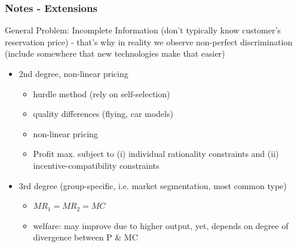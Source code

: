 \documentclass[10pt]{beamer}
\begin{document}
\begin{frame} 
	\frametitle{Notes - Extensions}
	
General Problem: Incomplete Information (don't typically know customer's reservation price) - that's why in reality we observe non-perfect discrimination (include somewhere that new technologies make that easier) 

	\begin{itemize}
		
		\item 2nd degree, non-linear pricing 
			\begin{itemize}
				\item hurdle method (rely on self-selection)
				\item quality differences (flying, car models)
				\item non-linear pricing
				\item Profit max. subject to (i) individual rationality constraints and (ii) incentive-compatibility constraints 
			\end{itemize}
		\item 3rd degree (group-specific, i.e. market segmentation, most common type)
		\begin{itemize}
			\item $MR_{1}=MR_{2}=MC$
			\item welfare: may improve due to higher output, yet, depends on degree of divergence between P \& MC
		\end{itemize}
	\end{itemize}
	
	
\end{frame}
\end{document}
